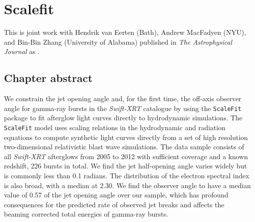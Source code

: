 \renewcommand{\chapid}{scalefit}


\newcommand{\scalefit}{{\texttt{ScaleFit}}}
\newcommand{\boxfit}{{\texttt{BoxFit}}}
\newcommand{\ramcode}{{\texttt{RAM}}}
\newcommand{\blastcode}{{\texttt{BLAST}}}
\newcommand{\swift}{{\it Swift}}
\newcommand{\swiftXRT}{{\it Swift-XRT}}
\newcommand{\XRT}{{\it XRT}}
\newcommand{\vela}{{\it Vela}}
\newcommand{\bepposax}{{\it BeppoSAX}}
\newcommand{\chandra}{{\it Chandra}}
\newcommand{\ram}{{\texttt{RAM}}}
\newcommand{\emcee}{{\texttt{emcee}}}
\newcommand{\multinest}{\texttt{MultiNest}}
\newcommand{\afterglowlibrary}{{\texttt{http://cosmo.nyu.edu/afterglowlibrary/}}}


\newcommand{\ddl}{d_{L,28}}
\newcommand{\Eiso}{E_{iso}}
\newcommand{\Edl}{E_{iso, 53}}
\newcommand{\ndl}{n_{0, 0}}
\newcommand{\thO}{\theta_0}
\newcommand{\thobs}{\theta_{obs}}
\newcommand{\epse}{\epsilon_e}
\newcommand{\epsB}{\epsilon_B}
\newcommand{\xN}{\xi_N}
\newcommand{\tobs}{t_{obs}}
\newcommand{\Fp}{F_{peak}}
\newcommand{\cf}{\mathfrak{f}}
\newcommand{\cfp}{\cf_{peak}}
\newcommand{\cfm}{\cf_{m}}
\newcommand{\cfc}{\cf_{c}}
\chapter{Scalefit }

This \paper is joint work with Hendrik van Eerten (Bath), Andrew MacFadyen (NYU), and Bin-Bin Zhang (University of Alabama) published in \emph{The Astrophysical Journal} as \citet{Ryan15}.

\section{Chapter abstract}

We constrain the jet opening angle and, for the first time, the off-axis observer angle for gamma-ray bursts in the \swiftXRT{} catalogue by using the \scalefit{} package to fit afterglow light curves directly to hydrodynamic simulations.
The \scalefit{} model uses scaling relations in the hydrodynamic and radiation equations to compute synthetic light curves directly from a set of high resolution two-dimensional relativistic blast wave simulations.  The data sample consists of all \swiftXRT{} afterglows from 2005 to 2012 with sufficient coverage and a known redshift, 226 bursts in total.  We find the jet half-opening angle varies widely but is commonly less than 0.1 radians.  The distribution of the electron spectral index is also broad, with a median at $2.30$. 
We find the observer angle to have a median value of 0.57 of the jet opening angle over our sample, which has profound consequences for the predicted rate of observed jet breaks and affects the beaming corrected total energies of gamma-ray bursts.

